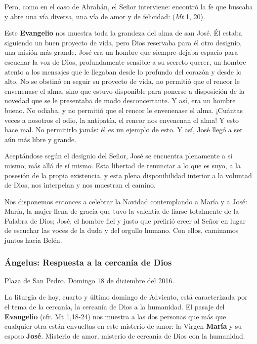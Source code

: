 \begin{body}
\begin{body}
Pero, como en el caso de Abrahán, el Señor interviene: encontró la fe que buscaba y abre una vía diversa, una vía de amor y de felicidad:  (\emph{Mt} 1, 20).

Este \textbf{Evangelio} nos muestra toda la grandeza del alma de san José. Él estaba siguiendo un buen proyecto de vida, pero Dios reservaba para él otro designio, una misión más grande. José era un hombre que siempre dejaba espacio para escuchar la voz de Dios, profundamente sensible a su secreto querer, un hombre atento a los mensajes que le llegaban desde lo profundo del corazón y desde lo alto. No se obstinó en seguir su proyecto de vida, no permitió que el rencor le envenenase el alma, sino que estuvo disponible para ponerse a disposición de la novedad que se le presentaba de modo desconcertante. Y así, era un hombre bueno. No odiaba, y no permitió que el rencor le envenenase el alma. ¡Cuántas veces a nosotros el odio, la antipatía, el rencor nos envenenan el alma! Y esto hace mal. No permitirlo jamás: él es un ejemplo de esto. Y así, José llegó a ser aún más libre y grande.

Aceptándose según el designio del Señor, José se encuentra plenamente a sí mismo, más allá de sí mismo. Esta libertad de renunciar a lo que es suyo, a la posesión de la propia existencia, y esta plena disponibilidad interior a la voluntad de Dios, nos interpelan y nos muestran el camino.

Nos disponemos entonces a celebrar la Navidad contemplando a María y a José: María, la mujer llena de gracia que tuvo la valentía de fiarse totalmente de la Palabra de Dios; José, el hombre fiel y justo que prefirió creer al Señor en lugar de escuchar las voces de la duda y del orgullo humano. Con ellos, caminamos juntos hacia Belén.

\subsubsection{Ángelus: Respuesta a la cercanía de Dios}

Plaza de San Pedro. Domingo 18 de diciembre del 2016.

La liturgia de hoy, cuarto y último domingo de Adviento, está caracterizada por el tema de la cercanía, la cercanía de Dios a la humanidad. El pasaje del \textbf{Evangelio} (cfr. Mt 1,18-24) nos muestra a las dos personas que más que cualquier otra están envueltas en este misterio de amor: la Virgen \textbf{María} y su esposo \textbf{José}. Misterio de amor, misterio de cercanía de Dios con la humanidad.


\end{body}
\end{body}
